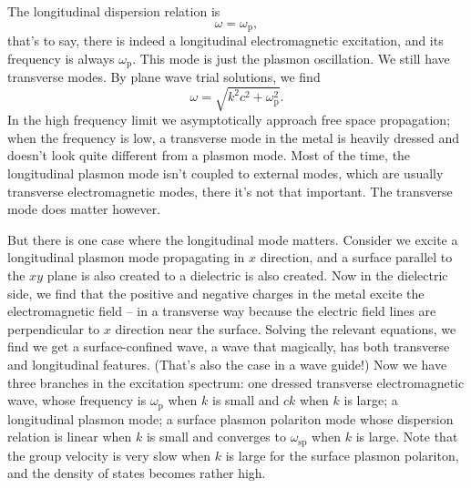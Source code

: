 \documentclass[hyperref, a4paper]{article}
\newcommand*{\omegap}{\omega_{\text{p}}}
\begin{document}
The longitudinal dispersion relation is 
\begin{equation}
    \omega = \omegap,
\end{equation}
that's to say, there is indeed a longitudinal electromagnetic excitation, 
and its frequency is always $\omegap$.
This mode is just the plasmon oscillation.
We still have transverse modes.
By plane wave trial solutions, we find 
\begin{equation}
    \omega = \sqrt{ k^2 c^2 + \omegap^2 }.
\end{equation}
In the high frequency limit we asymptotically approach free space propagation;
when the frequency is low, 
a transverse mode in the metal is heavily dressed
and doesn't look quite different from a plasmon mode.
Most of the time, the longitudinal plasmon mode isn't coupled to external modes,  
which are usually transverse electromagnetic modes, 
there it's not that important.
The transverse mode does matter however.

But there is one case where the longitudinal mode matters.
Consider we excite a longitudinal plasmon mode propagating in $x$ direction, 
and a surface parallel to the $xy$ plane is also created to a dielectric is also created.
Now in the dielectric side, 
we find that the positive and negative charges in the metal 
excite the electromagnetic field -- in a transverse way because 
the electric field lines are perpendicular to $x$ direction near the surface.
Solving the relevant equations, 
we find we get a surface-confined wave, 
a wave that magically, has both transverse and longitudinal features.
(That's also the case in a wave guide!)
Now we have three branches in the excitation spectrum:
one dressed transverse electromagnetic wave, 
whose frequency is $\omegap$ when $k$ is small and $ck$ when $k$ is large; 
a longitudinal plasmon mode;
a surface plasmon polariton mode whose dispersion relation is linear when $k$ is small 
and converges to $\omega_{\text{sp}}$  when $k$ is large.
Note that the group velocity is very slow when $k$ is large for the surface plasmon polariton, 
and the density of states becomes rather high.
\end{document}
